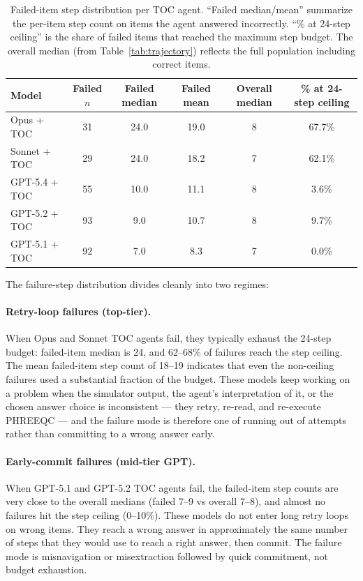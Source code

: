 \documentclass{article}
\begin{document}
\begin{table}[h]
\centering
\small
\setlength{\tabcolsep}{6pt}
\caption{Failed-item step distribution per TOC agent. ``Failed median/mean'' summarize the per-item step count on items the agent answered incorrectly. ``\% at 24-step ceiling'' is the share of failed items that reached the maximum step budget. The overall median (from Table~\ref{tab:trajectory}) reflects the full population including correct items.}
\label{tab:appendix-failure-step-distribution}
\begin{tabular}{lccccc}
\toprule
Model & Failed $n$ & Failed median & Failed mean & Overall median & \% at 24-step ceiling \\
\midrule
Opus + TOC & 31 & 24.0 & 19.0 & 8 & 67.7\% \\
Sonnet + TOC & 29 & 24.0 & 18.2 & 7 & 62.1\% \\
GPT-5.4 + TOC & 55 & 10.0 & 11.1 & 8 & 3.6\% \\
GPT-5.2 + TOC & 93 & 9.0 & 10.7 & 8 & 9.7\% \\
GPT-5.1 + TOC & 92 & 7.0 & 8.3 & 7 & 0.0\% \\
\bottomrule
\end{tabular}
\end{table}

The failure-step distribution divides cleanly into two regimes:

\paragraph{Retry-loop failures (top-tier).}
When Opus and Sonnet TOC agents fail, they typically exhaust the 24-step budget: failed-item median is 24, and 62--68\% of failures reach the step ceiling. The mean failed-item step count of 18--19 indicates that even the non-ceiling failures used a substantial fraction of the budget. These models keep working on a problem when the simulator output, the agent's interpretation of it, or the chosen answer choice is inconsistent --- they retry, re-read, and re-execute PHREEQC --- and the failure mode is therefore one of running out of attempts rather than committing to a wrong answer early.

\paragraph{Early-commit failures (mid-tier GPT).}
When GPT-5.1 and GPT-5.2 TOC agents fail, the failed-item step counts are very close to the overall medians (failed 7--9 vs overall 7--8), and almost no failures hit the step ceiling (0--10\%). These models do not enter long retry loops on wrong items. They reach a wrong answer in approximately the same number of steps that they would use to reach a right answer, then commit. The failure mode is misnavigation or misextraction followed by quick commitment, not budget exhaustion.
\end{document}
